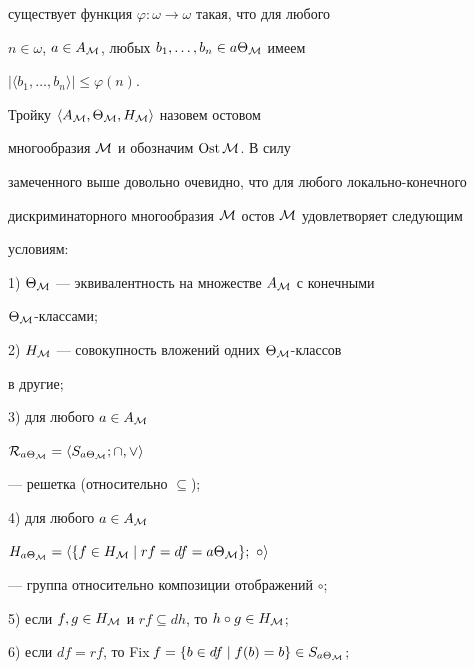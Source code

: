 существует функция $\varphi:\omega\to\omega$ такая, что для любого


$n\in\omega$, $a\in A_{{\cal M}}$, любых $b_1,\dotsc,b_n\in a\Theta_{{\cal M}}$ имеем


$|\langle b_1,\dotsc,b_n \rangle|\leq\varphi(n)$.





Тройку $\langle A_{{\cal M}},\Theta_{{\cal M}},H_{{\cal M}}\rangle$ назовем остовом


многообразия ${\cal M}$ и обозначим  $\operatorname{Ost}{\cal M}$. В силу


замеченного выше довольно очевидно, что для любого локально-конечного


дискриминаторного многообразия ${\cal M}$ остов ${\cal M}$ удовлетворяет следующим


условиям:





1) $\Theta_{{\cal M}}$ --- эквивалентность на множестве $A_{{\cal M}}$ с конечными


$\Theta_{{\cal M}}$-классами;





2) $H_{{\cal M}}$ --- совокупность вложений одних $\Theta_{{\cal M}}$-классов


в другие;





3) для любого $a\in A_{{\cal M}}$\;


${\cal R}_{a\Theta_{{\cal M}}}=\langle S_{a\Theta_{{\cal M}}};\cap,\vee\rangle$


--- решетка (относительно $\subseteq$);





4) для любого $a\in A_{{\cal M}}$\;


$H_{a\Theta_{\M}}=\langle\{f\in H_{\M}\mid rf=df=


a\Theta_{\M}\};\ \circ\rangle$


--- группа относительно композиции отображений $\circ$;





5) если $f,g\in H_{{\cal M}}$ и $rf\subseteq dh$, то $h\circ g\in H_{{\cal M}}$;





6) если $df=rf$, то Fix\,$f=\{b\in df\mid f(b)=b\}\in S_{a\Theta_{{\cal M}}}$;





